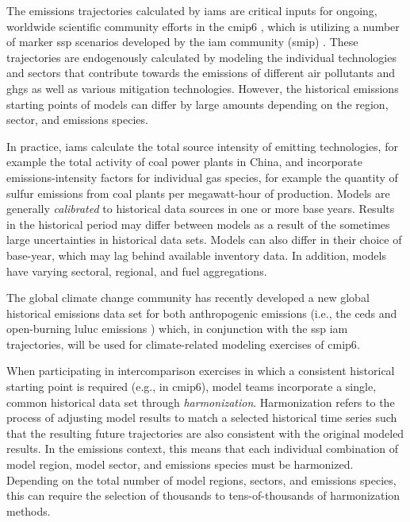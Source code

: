 \documentclass[review]{elsarticle}
\begin{document}
The emissions trajectories calculated by \glspl{iam} are critical inputs for
ongoing, worldwide scientific community efforts in the \gls{cmip6}
\cite{eyring_overview_2016}, which is utilizing a number of marker \gls{ssp} scenarios
developed by the \gls{iam} community (\gls{smip})
\cite{oneill_scenario_2016}. These trajectories are endogenously calculated by
modeling the individual technologies and sectors that contribute towards the
emissions of different air pollutants and \glspl{ghg} as well as various
mitigation technologies. However, the historical emissions starting points of
models can differ by large amounts depending on the region, sector, and
emissions species.

In practice, \glspl{iam} calculate the total source intensity of emitting
technologies, for example the total activity of coal power plants in China, and
incorporate emissions-intensity factors for individual gas species, for example
the quantity of sulfur emissions from coal plants per megawatt-hour of
production. Models are generally \textit{calibrated} to historical data sources
in one or more base years. Results in the historical period may differ between
models as a result of the sometimes large uncertainties in historical data
sets. Models can also differ in their choice of base-year, which may lag behind
available inventory data. In addition, models have varying sectoral, regional,
and fuel aggregations.

The global climate change community has recently developed a new global
historical emissions data set for both anthropogenic emissions (i.e., the
\gls{ceds} \cite{hoesly_historical_2017} and open-burning \gls{luluc} emissions
\cite{van_marle_historic_2017}) which, in conjunction with the \gls{ssp}
\gls{iam} trajectories, will be used for climate-related modeling exercises of
\gls{cmip6}.

When participating in intercomparison exercises in which a consistent historical
starting point is required (e.g., in \gls{cmip6}), model teams incorporate a single,
common historical data set through \textit{harmonization}. Harmonization
refers to the process of adjusting model results to match a selected
historical time series such that the resulting future trajectories are also
consistent with the original modeled results. In the emissions context, this
means that each individual combination of model region, model sector, and
emissions species must be harmonized. Depending on the total number of model
regions, sectors, and emissions species, this can require the selection of
thousands to tens-of-thousands of harmonization methods.
\end{document}
